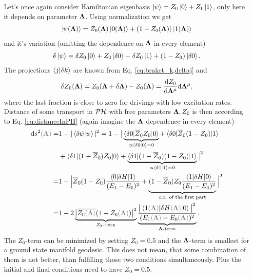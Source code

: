 Let's once again consider Hamiltonian eigenbasis $\ket{\psi}=Z_0\ket{0}+Z_1\ket{1}$, only here it depends on parameter ${\bm\Lambda}$. Using normalization we get
\begin{equation}
    \ket{\psi({\bm\Lambda})}=Z_0({\bm\Lambda}) \ket{0({\bm\Lambda})}+(1-Z_0({\bm\Lambda})) \ket{1({\bm\Lambda})}
\end{equation}
and it's variation (omitting the dependence on ${\bm\Lambda}$ in every element)
\begin{equation}
    \delta\ket{\psi}=\delta Z_0 \ket{0}+ Z_0 \ket{\delta 0}-\delta Z_0 \ket{1}+ (1-Z_0) \ket{\delta 0}.
    \label{eq:psiVariation}
\end{equation}
The projections $\braket{j|\delta k}$ are known from Eq. \ref{eq:braket_k,deltaj} and 
\begin{equation}
    \delta Z_0({\bm\Lambda})=Z_0({\bm\Lambda}+\delta {\bm\Lambda})-Z_0({\bm\Lambda})=\frac{\mathrm{d} Z_0}{\mathrm{d} {\bm\Lambda}^\mu}\mathrm{d}{\bm\Lambda}^\mu,
\end{equation}
where the last fraction is close to zero for drivings with low excitation rates. Distance of some transport in $\mathcal{PH}$ with free parameters ${\bm\Lambda},Z_0$ is then according to Eq. \ref{eq:distanceInPH} (again imagine the ${\bm\Lambda}$ dependence in every element)
\begin{equation}
    \begin{split}
        \d s^2\textcolor{gray}{(\llambda)} =& 1-|\braket{\delta \psi|\psi}|^2=1-\big|\underbrace{\braket{\delta 0|\overline{Z}_0 Z_0|0}}_{\propto \braket{\delta 0|0}=0}+\braket{\delta 0|\overline{Z}_0(1-Z_0)|1}\\
        &+\braket{\delta 1| (1-\overline{Z}_0)Z_0|0}+\underbrace{\braket{\delta 1|(1-\overline{Z}_0)(1-Z_0)|1}}_{\propto \braket{\delta 1|1}=0}\big|^2\\
        =&1-\Big| \overline{Z}_0(1-Z_0)\frac{\braket{0|\delta H|1}}{(E_1-E_0)^2} +\underbrace{(1-\overline{Z}_0)Z_0\frac{\braket{1|\delta H|0}}{(E_1-E_0)^2}}_{\text{c.c. of the first part}}\Big|^2\\
        =&1-2\underbrace{\big|\overline{Z_0\textcolor{gray}{(\llambda)}}(1-Z_0\textcolor{gray}{(\llambda)})\big|^2}_{Z_0\text{-term}}\underbrace{\frac{\big|\braket{1\textcolor{gray}{(\llambda)}|\delta H\textcolor{gray}{(\llambda)}|0}\big|^2}{(E_1\textcolor{gray}{(\llambda)}-E_0\textcolor{gray}{(\llambda)})^2}}_{\llambda\text{-term}}.
    \end{split}
\end{equation}
The $Z_0$-term can be minimized by setting $Z_0=0.5$ and the ${\bm\Lambda}$-term is smallest for a ground state manifold geodesic. This does not mean, that some combination of them is not better, than fulfilling those two conditions simultaneously. Plus the initial and final conditions need to have $Z_0=0.5$.





